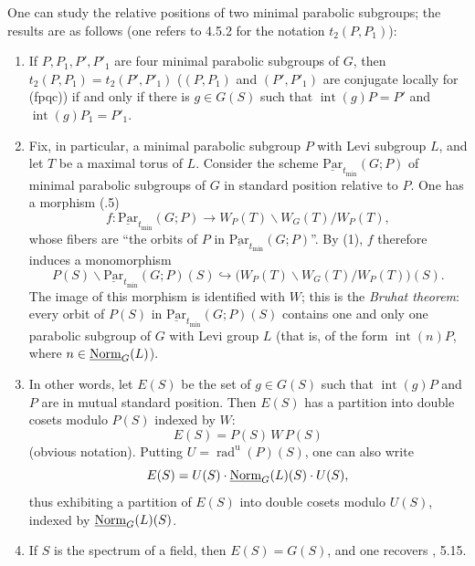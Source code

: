 \label{XXVI.7.10}
One can study the relative positions of two minimal parabolic subgroups; the results are as follows (one refers to 4.5.2 for the notation $t_2(P,P_1)$):
\begin{enumerate}[label=\textup{(\arabic*)}]
\item If $P,P_1,P',P'_1$ are four minimal parabolic subgroups of $G$, then $t_2(P,P_1)=t_2(P',P'_1)$ (\ie $(P,P_1)$ and $(P',P'_1)$ are conjugate locally for (fpqc)) if and only if there is $g\in G(S)$ such that $\operatorname{int}(g)P=P'$ and $\operatorname{int}(g)P_1=P'_1$.
\item Fix, in particular, a minimal parabolic subgroup $P$ with Levi subgroup $L$, and let $T$ be a maximal torus of $L$. Consider the scheme $\underline{\mathrm{Par}}_{t_{\min}}(G;P)$ of minimal parabolic subgroups of $G$ in standard position relative to $P$. One has a morphism (.5)
\[
 f:\underline{\mathrm{Par}}_{t_{\min}}(G;P)\to W_P(T)\backslash W_G(T)/W_P(T),
\]
whose fibers are ``the orbits of $P$ in $\underline{\mathrm{Par}}_{t_{\min}}(G;P)$''. By (1), $f$ therefore induces a monomorphism
\[
 P(S)\backslash\underline{\mathrm{Par}}_{t_{\min}}(G;P)(S)
 \hookrightarrow\bigl(W_P(T)\backslash W_G(T)/W_P(T)\bigr)(S).
\]
The image of this morphism is identified with $W$; this is the \emph{Bruhat theorem}: every orbit of $P(S)$ in $\underline{\mathrm{Par}}_{t_{\min}}(G;P)(S)$ contains one and only one parabolic subgroup of $G$ with Levi group $L$ (that is, of the form $\operatorname{int}(n)P$, where $n\in\underline{\mathrm{Norm}}_G(L)$).
\item In other words, let $E(S)$ be the set of $g\in G(S)$ such that $\operatorname{int}(g)P$ and $P$ are in mutual standard position. Then $E(S)$ has a partition into double cosets modulo $P(S)$ indexed by $W$:
\[
 E(S)=P(S)\,W\,P(S)
\]
(obvious notation). Putting $U=\operatorname{rad}^{\mathrm u}(P)(S)$, one can also write
\[
 E(S)=U(S)\cdot\underline{\mathrm{Norm}}_G(L)(S)\cdot U(S),
\]
thus exhibiting a partition of $E(S)$ into double cosets modulo $U(S)$, indexed by $\underline{\mathrm{Norm}}_G(L)(S)$.
\item If $S$ is the spectrum of a field, then $E(S)=G(S)$, and one recovers \cite{BT65}, 5.15.
\end{enumerate}

